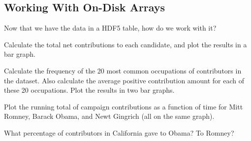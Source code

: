 \subsection*{Working With On-Disk Arrays}
Now that we have the data in a HDF5 table, how do we work with it?
\begin{problem}
Calculate the total net contributions to each candidate, and plot the results in a bar graph.
\end{problem}

\begin{problem}
Calculate the frequency of the 20 most common occupations of contributors in the dataset. 
Also calculate the average positive contribution amount for each of these 20 occupations.
Plot the results in two bar graphs.
\end{problem}

\begin{problem}
Plot the running total of campaign contributions as a function of time
for Mitt Romney, Barack Obama, and Newt Gingrich (all on the same graph). 
\end{problem}

\begin{problem}
What percentage of contributors in California gave to Obama? To Romney?
\end{problem}